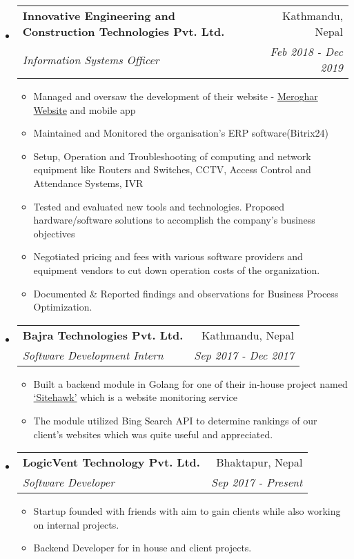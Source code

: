 \documentclass[letterpaper,11pt]{article}
\makeatletter
\newcommand{\cvsubheading}[4]{
\begin{tabular*}{6.5in}{l@{\cftdotfill{\cftsecdotsep}\extracolsep{\fill}}r}
        \textbf{#1} & #2 \\
        \textit{#3} & \textit{#4} \\
\end{tabular*}\vspace{-6pt}}
\newcommand{\cvitem}[1]{\item #1 \vspace{-2pt}}
\makeatother
\begin{document}
\begin{itemize}
      \item
            \cvsubheading{Innovative Engineering and Construction Technologies Pvt. Ltd.}{Kathmandu, Nepal}{Information Systems Officer}{Feb 2018  - Dec 2019}
            \begin{itemize}
                  \cvitem{Managed and oversaw the development of their website - \href{https://meroghar.com}{Meroghar Website} and mobile app}
                  \cvitem{Maintained and Monitored the organisation’s ERP software(Bitrix24)}
                  \cvitem{Setup, Operation and Troubleshooting of computing and network equipment like Routers and Switches, CCTV, Access Control and Attendance Systems, IVR}
                  \cvitem{Tested and evaluated new tools and technologies. Proposed hardware/software solutions to accomplish the company's business objectives}
                  \cvitem{Negotiated pricing and fees with various software providers and equipment vendors to cut down operation costs of the organization.}
                  \cvitem{Documented \& Reported findings and observations for Business Process Optimization.}
            \end{itemize}
            
      \item
            \cvsubheading{Bajra Technologies Pvt. Ltd.}{Kathmandu, Nepal}{Software Development Intern}{Sep 2017 - Dec 2017}
            \begin{itemize}
                  \cvitem{Built a backend module in Golang for one of their in-house project named \href{https://sitehawk.io}{‘Sitehawk’} which is a website monitoring service}
                  \cvitem{The module utilized Bing Search API to determine rankings of our client's websites which was quite useful and appreciated.}
            \end{itemize}
            
      \item
            \cvsubheading{LogicVent Technology Pvt. Ltd.}{Bhaktapur, Nepal}{Software Developer}{Sep 2017 - Present}
            \begin{itemize}
                  \cvitem{Startup founded with friends with aim to gain clients while also working on internal projects.}
                  \cvitem{Backend Developer for in house and client projects.}
            \end{itemize}
            

\end{itemize}
\end{document}
